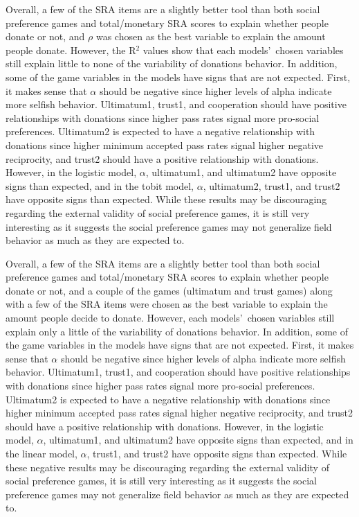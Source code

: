 \documentclass[12pt]{article}
\begin{document}
Overall, a few of the SRA items are a slightly better tool than both social preference games and total/monetary SRA scores to explain whether people donate or not, and \(\rho\) was chosen as the best variable to explain the amount people donate. However, the R$^{2}$ values show that each models\rq \ chosen variables still explain little to none of the variability of donations behavior. In addition, some of the game variables in the models have signs that are not expected. First, it makes sense that \(\alpha\) should be negative since higher levels of alpha indicate more selfish behavior. Ultimatum1, trust1, and cooperation should have positive relationships with donations since higher pass rates signal more pro-social preferences. Ultimatum2 is expected to have a negative relationship with donations since higher minimum accepted pass rates signal higher negative reciprocity, and trust2 should have a positive relationship with donations. However, in the logistic model, \(\alpha\), ultimatum1, and ultimatum2 have opposite signs than expected, and in the tobit model, \(\alpha\), ultimatum2, trust1, and trust2 have opposite signs than expected. While these results may be discouraging regarding the external validity of social preference games, it is still very interesting as it suggests the social preference games may not generalize field behavior as much as they are expected to.

{\color{blue}Overall, a few of the SRA items are a slightly better tool than both social preference games and total/monetary SRA scores to explain whether people donate or not, and a couple of the games (ultimatum and trust games) along with a few of the SRA items were chosen as the best variable to explain the amount people decide to donate. However, each models\rq \ chosen variables still explain only a little of the variability of donations behavior. In addition, some of the game variables in the models have signs that are not expected. First, it makes sense that \(\alpha\) should be negative since higher levels of alpha indicate more selfish behavior. Ultimatum1, trust1, and cooperation should have positive relationships with donations since higher pass rates signal more pro-social preferences. Ultimatum2 is expected to have a negative relationship with donations since higher minimum accepted pass rates signal higher negative reciprocity, and trust2 should have a positive relationship with donations. However, in the logistic model, \(\alpha\), ultimatum1, and ultimatum2 have opposite signs than expected, and in the linear model, \(\alpha\), trust1, and trust2 have opposite signs than expected. While these negative results may be discouraging regarding the external validity of social preference games, it is still very interesting as it suggests the social preference games may not generalize field behavior as much as they are expected to.}
\end{document}
